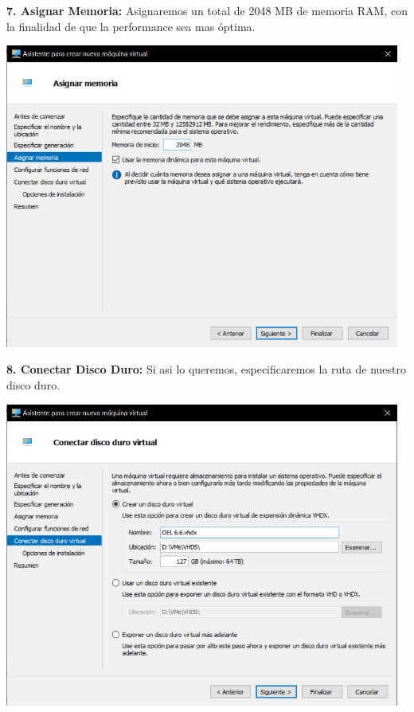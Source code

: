 \begin{enumerate}
\textbf {7. Asignar Memoria:} Asignaremos un total de 2048 MB de memoria RAM, con la finalidad de que la performance sea mas óptima.
\begin{center}
  \includegraphics[width=13cm]{Imagenes/Asignar_Memoria.png}
\end{center}
\break

\textbf {8. Conectar Disco Duro:} Si asi lo queremos, especificaremos la ruta de nuestro disco duro.
\begin{center}
  \includegraphics[width=13cm]{Imagenes/Conectar_Disco.png}
\end{center}
\vspace{12pt}\\


\end{enumerate}
